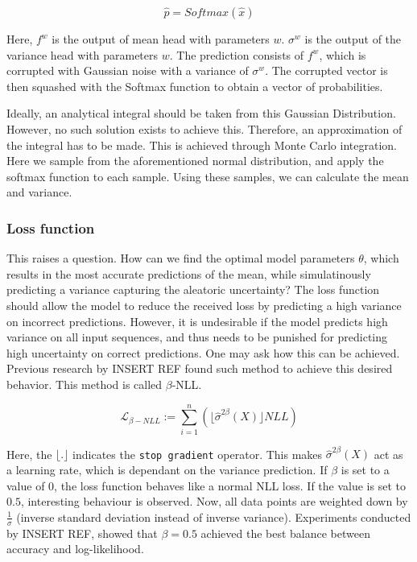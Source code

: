 \begin{equation}
    \hat{p} = Softmax(\hat{x})
\end{equation}

Here, $f^w$ is the output of mean head with parameters $w$. $\sigma^w$ is the output of the variance head with parameters $w$. The prediction consists of $f^w$, which is corrupted with Gaussian noise with a variance of $\sigma^w$. The corrupted vector is then squashed with the Softmax function to obtain a vector of probabilities.

Ideally, an analytical integral should be taken from this Gaussian Distribution. However, no such solution exists to achieve this. Therefore, an approximation of the integral has to be made. This is achieved through Monte Carlo integration. Here we sample from the aforementioned normal distribution, and apply the softmax function to each sample. Using these samples, we can calculate the mean and variance.


\subsubsection{Loss function}

This raises a question. How can we find the optimal model parameters $\theta$, which results in the most accurate predictions of the mean, while simulatinously predicting a variance capturing the aleatoric uncertainty? The loss function should allow the model to reduce the received loss by predicting a high variance on incorrect predictions. However, it is undesirable if the model predicts high variance on all input sequences, and thus needs to be punished for predicting high uncertainty on correct predictions. One may ask how this can be achieved. Previous research by {INSERT REF} found such method to achieve this desired behavior. This method is called $\beta$-NLL.

\begin{equation}
    \mathcal{L}_{\beta-NLL} := \sum_{i = 1}^{n} \left( \lfloor \hat{\sigma}^{2\beta}(X) \rfloor NLL \right)
\end{equation}

Here, the $\lfloor. \rfloor$ indicates the \verb|stop gradient| operator. This makes $\hat{\sigma}^{2\beta}(X)$ act as a learning rate, which is dependant on the variance prediction. If $\beta$ is set to a value of 0, the loss function behaves like a normal NLL loss. If the value is set to $0.5$, interesting behaviour is observed. Now, all data points are weighted down by $\frac{1}{\sigma}$ (inverse standard deviation instead of inverse variance). Experiments conducted by {INSERT REF}, showed that $\beta = 0.5$ achieved the best balance between accuracy and log-likelihood.

